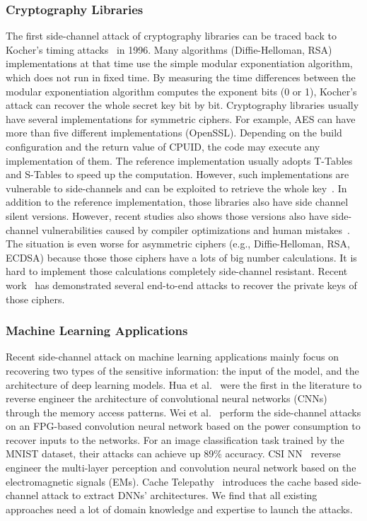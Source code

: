 \subsubsection{Cryptography Libraries}
The first side-channel attack of cryptography libraries can be traced back to Kocher's timing attacks~\cite{kocher1996timing} in 1996. Many algorithms (Diffie-Helloman, RSA) implementations at that time use the simple modular exponentiation algorithm, which does not run in fixed time. By measuring the time differences between the modular exponentiation algorithm computes the exponent bits (0 or 1), Kocher's attack can recover the whole secret key bit by bit. Cryptography libraries usually have several implementations for symmetric ciphers.
For example, AES can have more than five different implementations (OpenSSL). Depending on the build configuration and the return value of \textsf{CPUID}, the code may execute any implementation of them. The reference implementation usually adopts T-Tables and S-Tables to speed up the computation. However, such implementations are vulnerable to side-channels and can be exploited to retrieve the whole key~\cite{bonneau2006cache}. In addition to the reference implementation, those libraries also have side channel silent versions. However, recent studies also shows those versions also have side-channel vulnerabilities caused by compiler optimizations and human mistakes~\cite{217537}. The situation is even worse for asymmetric ciphers (e.g., Diffie-Helloman, RSA, ECDSA) because those those ciphers have a lots of big number calculations. It is hard to implement those calculations completely side-channel resistant. Recent work~\cite{arnaud2013timing,yarom2017cachebleed,yarom2014flush+} has demonstrated several end-to-end attacks to recover the private keys of those ciphers.
\subsubsection{Machine Learning Applications}
Recent side-channel attack on machine learning applications mainly focus on recovering two types of the sensitive information: the input of the model, and the architecture of deep learning models. Hua et al.~\cite{hua2018reverse} were the first in the literature to reverse engineer the architecture of convolutional neural networks (CNNs) through the memory access patterns. Wei et al.~\cite{wei2018know} perform the side-channel attacks on an FPG-based convolution neural network based on the power consumption to recover inputs to the networks. For an image classification task trained by the MNIST dataset, their attacks can achieve up 89\% accuracy. CSI NN~\cite{batina2019csi} reverse engineer the multi-layer perception and convolution neural network based on the electromagnetic signals (EMs). Cache Telepathy~\cite{yan2020cache} introduces the cache based side-channel attack to extract DNNs' architectures. We find that all existing approaches need a lot of domain knowledge and expertise to launch the attacks.

